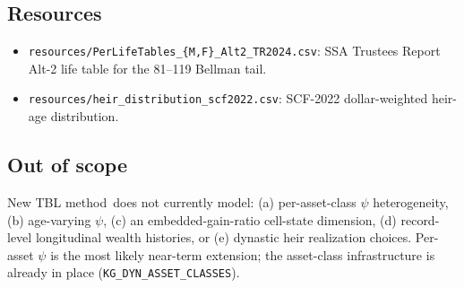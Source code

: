 \documentclass[11pt]{article}
\newcommand{\dyn}{New TBL method}
\begin{document}
\subsection{Resources}

\begin{itemize}
  \item \texttt{resources/PerLifeTables\_\{M,F\}\_Alt2\_TR2024.csv}:
        SSA Trustees Report Alt-2 life table for the 81--119 Bellman tail.
  \item \texttt{resources/heir\_distribution\_scf2022.csv}: SCF-2022
        dollar-weighted heir-age distribution.
\end{itemize}

\subsection{Out of scope}

\dyn\ does not currently model: (a) per-asset-class $\psi$ heterogeneity,
(b) age-varying $\psi$, (c) an embedded-gain-ratio cell-state dimension,
(d) record-level longitudinal wealth histories, or (e) dynastic heir
realization choices. Per-asset $\psi$ is the most likely near-term
extension; the asset-class infrastructure is already in place
(\texttt{KG\_DYN\_ASSET\_CLASSES}).
\end{document}

